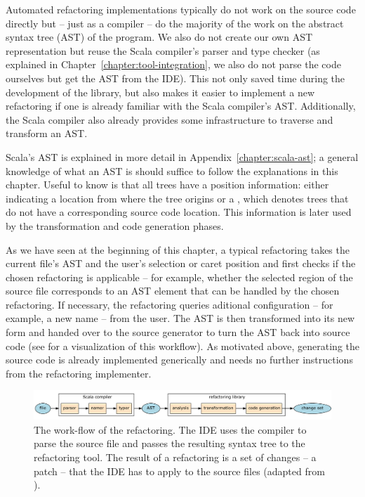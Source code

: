 Automated refactoring implementations typically do not work on the source code directly but -- just as a compiler -- do the majority of the work on the abstract syntax tree (AST) of the program. We also do not create our own AST representation but reuse the Scala compiler's parser and type checker (as explained in Chapter~\ref{chapter:tool-integration}, we also do not parse the code ourselves but get the AST from the IDE). This not only saved time during the development of the library, but also makes it easier to implement a new refactoring if one is already familiar with the Scala compiler's AST. Additionally, the Scala compiler also already provides some infrastructure to traverse and transform an AST.


Scala's AST is explained in more detail in Appendix~\vref{chapter:scala-ast}; a general knowledge of what an AST is should suffice to follow the explanations in this chapter. Useful to know is that all trees have a position information: either indicating a location from where the tree origins or a , which denotes trees that do not have a corresponding source code location. This information is later used by the transformation and code generation phases.

As we have seen at the beginning of this chapter, a typical refactoring takes the current file's AST and the user's selection or caret position and first checks if the chosen refactoring is applicable -- for example, whether the selected region of the source file corresponds to an AST element that can be handled by the chosen refactoring. If necessary, the refactoring queries aditional configuration -- for example, a new name -- from the user. The AST is then transformed into its new form and handed over to the source generator to turn the AST back into source code (see  for a visualization of this workflow). As motivated above, generating the source code is already implemented generically and needs no further instructions from the refactoring implementer. %

\begin{figure}
  \centering
  \includegraphics[width=\linewidth]{refactoring-flow.pdf}
  \caption{The work-flow of the refactoring. The IDE uses the compiler to parse the source file and passes the resulting syntax tree to the refactoring tool. The result of a refactoring is a set of changes -- a patch -- that the IDE has to apply to the source files (adapted from \cite{ScalaRefactoring}).}
  \label{figure:refactoring-flow}
\end{figure}

